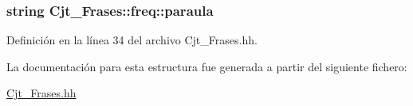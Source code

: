 \subsubsection[{\texorpdfstring{paraula}{paraula}}]{\setlength{\rightskip}{0pt plus 5cm}string Cjt\+\_\+\+Frases\+::freq\+::paraula}\hypertarget{struct_cjt___frases_1_1freq_a82c8d32210892aa8888dcbec44c2785f}{}\label{struct_cjt___frases_1_1freq_a82c8d32210892aa8888dcbec44c2785f}


Definición en la línea 34 del archivo Cjt\+\_\+\+Frases.\+hh.



La documentación para esta estructura fue generada a partir del siguiente fichero\+:\begin{DoxyCompactItemize}
\item 
\hyperlink{_cjt___frases_8hh}{Cjt\+\_\+\+Frases.\+hh}\end{DoxyCompactItemize}
